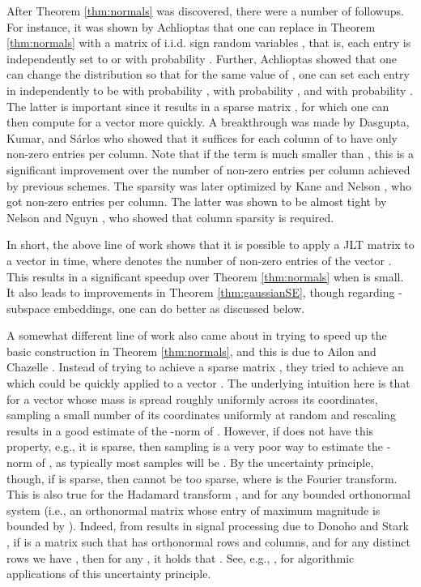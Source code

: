 \documentclass[11pt]{article}
\begin{document}
After Theorem \ref{thm:normals} was discovered, there were a number of followups. For instance, it was
shown by Achlioptas that one can replace  in Theorem \ref{thm:normals} with a matrix of i.i.d. sign random variables \cite{Ach03}, 
that is, each entry is independently set to  or  with probability . Further, Achlioptas 
showed that one can change the distribution so that for the same value of , one can set each entry
in  independently to be  with probability ,  with probability , and  
with probability .
The latter is important since it results in a sparse matrix , for which one can then compute  for
a vector  more quickly. A breakthrough was made by Dasgupta, Kumar, and S\'arlos \cite{dks10}
who showed that it suffices for each column of  to have only  non-zero entries
per column. Note that if the  term is much smaller than , this is a significant
improvement over the  number of non-zero entries per column achieved by previous
schemes. The  sparsity was later optimized by Kane and Nelson \cite{kn14}, who got
 non-zero entries per column. The latter was shown to be almost tight by
Nelson and Nguyn \cite{nn13lb}, who showed that  column sparsity is required. 

In short, the above line of work shows that it is possible to apply a JLT  matrix 
to a vector  in  time, where  denotes the number
of non-zero entries of the vector . This results in a significant speedup over Theorem \ref{thm:normals}
when  is small. It also leads to improvements in Theorem \ref{thm:gaussianSE}, though regarding
-subspace embeddings, one can do better as discussed below.

A somewhat different line of work also came about in trying to speed up the basic construction
in Theorem \ref{thm:normals}, and this is due to Ailon and Chazelle \cite{AC06}. Instead of trying to achieve
a sparse matrix , they tried to achieve an  which could be quickly applied to a vector . 
The underlying
intuition here is that for a vector  
whose  mass is spread roughly uniformly across its  coordinates, sampling a small number of
its coordinates uniformly at random and rescaling results in a good estimate of the -norm of . 
However, if  does not have this property, e.g., it is sparse, then sampling is a very poor way to estimate
the -norm of , as typically most samples will be . By the uncertainty principle, though, 
if  is sparse, then  cannot be too sparse, 
where  is the Fourier transform. This is also true for the
Hadamard transform , and for any bounded orthonormal system (i.e., an orthonormal matrix
whose entry of maximum magnitude is bounded by ). Indeed, from results in signal processing due
to Donoho and Stark \cite{DS89}, 
if  is a  matrix such that  has orthonormal rows and columns,
and for any distinct rows  we have , then for any
, it holds that . See, e.g., \cite{i07}, 
for algorithmic applications of this uncertainty principle. 
\end{document}
